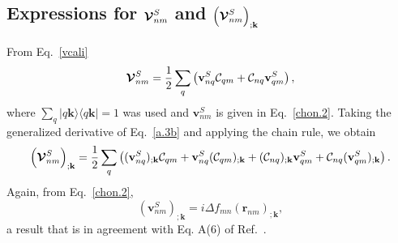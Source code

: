 \documentclass[floatfix,prb,aps,superscriptaddress,showpacs,letterpaper]{revtex4}
\begin{document}
\subsection{Expressions for  \texorpdfstring{$\boldsymbol{\mathcal{\cal V}}^{S}_{nm}$}{Vnm}
and
\texorpdfstring{$\Big({\boldsymbol{\mathcal{\cal V}}}^{S}_{nm}\Big)_{;\mathbf{k}}$}{(Vnm);kb}
}\label{calvs} 

From Eq.~\eqref{vcali}
\begin{equation}
\boldsymbol{\mathcal{\cal V}}^{S}_{nm}
=
\frac{1}{2}\sum_q\left(   
\mathbf{v}^S_{nq}{\mathbf{\cal C}}_{qm}+{\mathbf{\cal C}}_{nq}\mathbf{v}^S_{qm}
\right)  
,
\label{a.3b}
\end{equation}    
where $\sum_q | q\mathbf{k}\rangle\langle q\mathbf{k} | =1$ was used
and $\mathbf{v}^S_{nm}$ is given in Eq.~\eqref{chon.2}.
Taking the generalized derivative of Eq.~\eqref{a.3b}
and applying
the chain rule, we obtain
\begin{equation*}
\left(\boldsymbol{\mathcal{\cal V}}^{S}_{nm}\right)_{;\mathbf{k}}
=
\frac{1}{2}\sum_q\left(
(\mathbf{v}^S_{nq})_{;\mathbf{k}}{\mathbf{\cal C}}_{qm}
+    
\mathbf{v}^S_{nq}({\mathbf{\cal C}}_{qm})_{;\mathbf{k}}
+
({\mathbf{\cal C}}_{nq})_{;\mathbf{k}} \mathbf{v}^S_{qm}
+
{\mathbf{\cal C}}_{nq} (\mathbf{v}^S_{qm})_{;\mathbf{k}}
\right)  
.
\end{equation*}    
Again, from
Eq.~\eqref{chon.2}, 
\begin{equation*}
(\mathbf{v}^S_{nm})_{;\mathbf{k}}=i\Delta f_{mn}
(\mathbf{r}_{nm})_{;\mathbf{k}}
,
\end{equation*}
a result that is in agreement with Eq. A(6) of Ref.~.

\newpage

\end{document}
